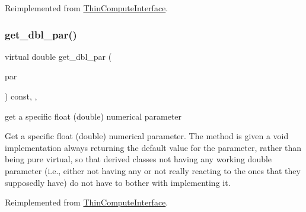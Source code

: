 Reimplemented from \mbox{\hyperlink{class_s_m_spp__di__unipi__it_1_1_thin_compute_interface_adaa8da125823294995410c022a59a4b5}{Thin\+Compute\+Interface}}.

\mbox{\label{class_s_m_spp__di__unipi__it_1_1_f_row_constraint_af7101b9f3e872b6ad9129ab99cff4cb7}} 
\subsubsection{\texorpdfstring{get\+\_\+dbl\+\_\+par()}{get\_dbl\_par()}}
{\footnotesize\ttfamily virtual double get\+\_\+dbl\+\_\+par (\begin{DoxyParamCaption}\item[{const \mbox{\hyperlink{class_s_m_spp__di__unipi__it_1_1_thin_compute_interface_aa3d710629ad8c434286726ad810c3b47}{idx\+\_\+type}}}]{par }\end{DoxyParamCaption}) const\hspace{0.3cm}{\ttfamily [inline]}, {\ttfamily [override]}, {\ttfamily [virtual]}}



get a specific float (double) numerical parameter 

Get a specific float (double) numerical parameter. The method is given a void implementation always returning the default value for the parameter, rather than being pure virtual, so that derived classes not having any working double parameter (i.\+e., either not having any or not really reacting to the ones that they supposedly have) do not have to bother with implementing it. 

Reimplemented from \mbox{\hyperlink{class_s_m_spp__di__unipi__it_1_1_thin_compute_interface_a16a600de08446b386bc437d8448ef44a}{Thin\+Compute\+Interface}}.

\mbox{\label{class_s_m_spp__di__unipi__it_1_1_f_row_constraint_a465a771c115acf8d5f4e32e22f003014}} 
